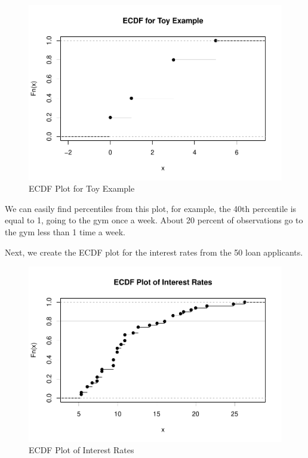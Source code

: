 \documentclass[
]{book}
\newenvironment{Shaded}{\begin{snugshade}}{\end{snugshade}}
\newcommand{\AttributeTok}[1]{\textcolor[rgb]{0.13,0.29,0.53}{#1}}
\newcommand{\FloatTok}[1]{\textcolor[rgb]{0.00,0.00,0.81}{#1}}
\newcommand{\FunctionTok}[1]{\textcolor[rgb]{0.13,0.29,0.53}{\textbf{#1}}}
\newcommand{\NormalTok}[1]{#1}
\newcommand{\SpecialCharTok}[1]{\textcolor[rgb]{0.81,0.36,0.00}{\textbf{#1}}}
\newcommand{\StringTok}[1]{\textcolor[rgb]{0.31,0.60,0.02}{#1}}
\begin{document}
\begin{figure}
\centering
\includegraphics{bookdown-demo_files/figure-latex/ecdf-1.pdf}
\caption{\label{fig:ecdf}ECDF Plot for Toy Example}
\end{figure}

We can easily find percentiles from this plot, for example, the 40th percentile is equal to 1, going to the gym once a week. About 20 percent of observations go to the gym less than 1 time a week.

Next, we create the ECDF plot for the interest rates from the 50 loan applicants.

\begin{Shaded}
\end{Shaded}

\begin{figure}
\centering
\includegraphics{bookdown-demo_files/figure-latex/ecdfreal-1.pdf}
\caption{\label{fig:ecdfreal}ECDF Plot of Interest Rates}
\end{figure}
\end{document}
